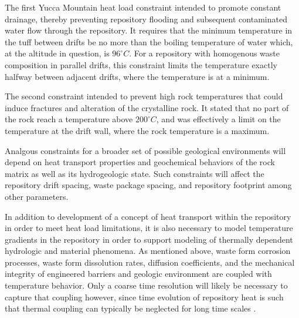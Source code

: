 The first Yucca Mountain heat load constraint intended to promote constant 
drainage, thereby preventing repository flooding and subsequent 
contaminated water flow through the repository. It 
requires that the minimum temperature in the tuff between drifts be no  
more than the boiling temperature of water which, at the altitude in 
question, is $96^{\circ}C$. For a repository with homogenous waste composition 
in parallel drifts, this constraint limits the temperature exactly 
halfway between adjacent drifts, where the temperature is at a minimum.

The second constraint intended to prevent high rock temperatures that 
could induce fractures and alteration of the crystalline rock. It stated 
that no part of the rock reach a temperature above $200^{\circ}C$, and was 
effectively a limit on the temperature at the drift wall, where the 
rock temperature is a maximum.  

Analgous constraints for a broader set of possible geological 
environments will depend on heat transport properties and geochemical 
behaviors of the rock matrix as well as its hydrogeologic state.  
Such constraints will affect the  repository drift spacing, waste package 
spacing, and repository footprint among other parameters. 


In addition to development of a concept of heat transport within the 
repository in order to meet heat load limitations, it 
is also necessary to model temperature gradients in the repository in  
order to support modeling of thermally dependent hydrologic and material 
phenomena.  As mentioned above, waste form corrosion processes, waste form
dissolution rates, diffusion coefficients, and the mechanical 
integrity of engineered barriers and geologic environment are coupled with 
temperature behavior. Only a coarse time resolution will likely be necessary 
to capture that coupling however, since time evolution of repository heat is
such that thermal coupling can typically be neglected for long time scales
\cite{andra_argile:_2005}. %

